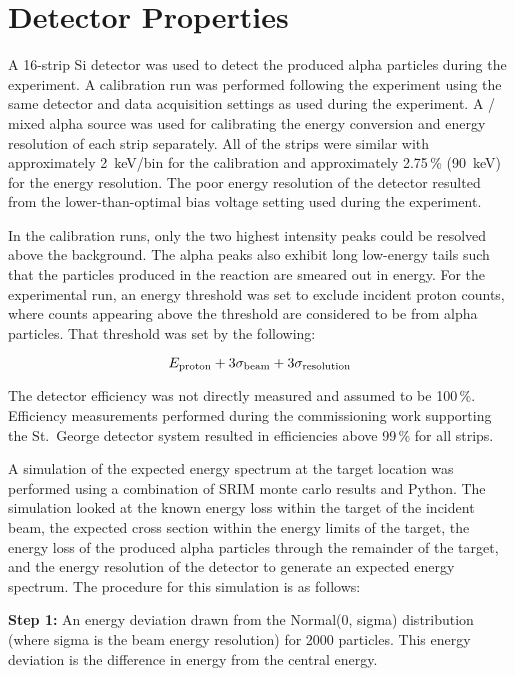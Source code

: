 \section{Detector Properties}
\label{sec:detector-properties}

A 16-strip Si detector was used to detect the produced alpha particles during
the experiment. A calibration run was performed following the experiment using
the same detector and data acquisition settings as used during the experiment.
A / mixed alpha source was used for calibrating the
energy conversion and energy resolution of each strip separately. All of the
strips were similar with approximately 2~keV/bin for the calibration and
approximately 2.75\,\% (90~keV) for the energy resolution. The poor
energy resolution of the detector resulted from the lower-than-optimal
bias voltage setting used during the experiment.

In the calibration runs, only the two highest intensity peaks could be resolved
above the background. The alpha peaks also exhibit long
low-energy tails such that the particles produced in the \alpa{} reaction are
smeared out in energy. For the experimental run, an energy threshold was
set to exclude incident proton counts, where counts appearing above the
threshold are considered to be from alpha particles. That threshold was
set by the following:

\begin{equation}
    E_{\rm proton} + 3 \sigma_{\rm beam} + 3 \sigma_{\rm resolution}
\end{equation}

The detector efficiency was not directly measured and assumed to be
100\,\%. Efficiency measurements performed during the commissioning work
supporting the St.\ George detector system resulted in efficiencies above
99\,\% for all strips.

A simulation of the expected energy spectrum at the target location was
performed using a combination of SRIM monte carlo results and Python. The
simulation looked at the known energy loss within the target of the incident
beam, the expected cross
section within the energy limits of the target, the energy loss of the
produced alpha particles through the remainder of the target, and the
energy resolution of the detector to generate an expected energy
spectrum. The procedure for this simulation is as follows:


\textbf{Step 1:}
  An energy deviation drawn from the Normal(0, sigma) distribution
  (where sigma is the beam energy resolution) for 2000 particles. This
  energy deviation is the difference in energy from the central energy.

